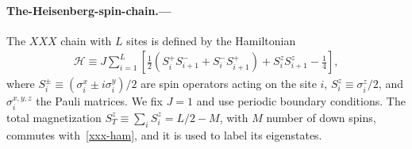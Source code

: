 \documentclass[twocolumn,superscriptaddress,prb,10pt]{revtex4-1}
\begin{document}
\paragraph*{The-Heisenberg-spin-chain.---}

The $XXX$ chain with $L$ sites is defined by the Hamiltonian 
%
\begin{align}
\label{xxx-ham}
{\mathcal H}\equiv J\sum\limits_{i=1}^L\left[\frac{1}{2}(S_i^+S^-_{i+1} 
+S_i^{-}S_{i+1}^+)+S_i^zS_{i+1}^z-\frac{1}{4}\right], 
\end{align}
%
where $S^{\pm}_i\equiv (\sigma_i^x\pm i\sigma_i^y)/2$ are spin operators acting on the 
site $i$, $S_i^z\equiv\sigma_i^z/2$, and $\sigma^{x,y,z}_i$ the Pauli matrices. We fix 
$J=1$ and use periodic boundary conditions. The total 
magnetization $S_{T}^z\equiv\sum_iS_i^z=L/2-M$, with $M$ number of down spins, 
commutes with~\eqref{xxx-ham}, and it is used to label its eigenstates. 
\end{document}

